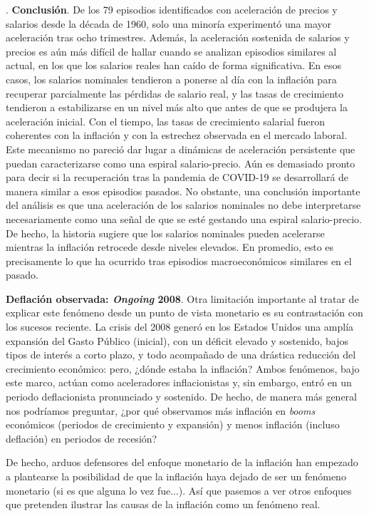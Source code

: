 \documentclass[10pt,a4paper]{article}
\newcounter{numitem}
\newenvironment{lnum}
      {\begin{list}{\arabic{numitem}.}{%
          \usecounter{numitem}%
          \setlength{\leftmargin}{1cm}%
          \setlength{\parskip}{3pt}%
          \setlength{\itemsep}{0pt}%
          \setlength{\parsep}{0pt}%
      }}
      {\end{list}}
\begin{document}
\begin{lnum}
{    \textbf{Conclusión}. De los 79 episodios identificados con aceleración de precios y salarios desde la década de 1960, solo una minoría experimentó una mayor aceleración tras ocho trimestres. Además, la aceleración sostenida de salarios y precios es aún más difícil de hallar cuando se analizan episodios similares al actual, en los que los salarios reales han caído de forma significativa. En esos casos, los salarios nominales tendieron a ponerse al día con la inflación para recuperar parcialmente las pérdidas de salario real, y las tasas de crecimiento tendieron a estabilizarse en un nivel más alto que antes de que se produjera la aceleración inicial. Con el tiempo, las tasas de crecimiento salarial fueron coherentes con la inflación y con la estrechez observada en el mercado laboral. Este mecanismo no pareció dar lugar a dinámicas de aceleración persistente que puedan caracterizarse como una espiral salario-precio. Aún es demasiado pronto para decir si la recuperación tras la pandemia de COVID-19 se desarrollará de manera similar a esos episodios pasados. No obstante, una conclusión importante del análisis es que una aceleración de los salarios nominales no debe interpretarse necesariamente como una señal de que se esté gestando una espiral salario-precio. De hecho, la historia sugiere que los salarios nominales pueden acelerarse mientras la inflación retrocede desde niveles elevados. En promedio, esto es precisamente lo que ha ocurrido tras episodios macroeconómicos similares en el pasado.
    }
    \item \textbf{Deflación observada: \textit{Ongoing} 2008}. Otra limitación importante al tratar de explicar este fenómeno desde un punto de vista monetario es su contrastación con los sucesos reciente. La crisis del 2008 generó en los Estados Unidos una amplía expansión del Gasto Público (inicial), con un déficit elevado y sostenido, bajos tipos de interés a corto plazo, y todo acompañado de una drástica reducción del crecimiento económico: pero, ¿dónde estaba la inflación? Ambos fenómenos, bajo este marco, actúan como aceleradores inflacionistas y, sin embargo, entró en un periodo deflacionista pronunciado y sostenido. De hecho, de manera más general nos podríamos preguntar, ¿por qué observamos más inflación en \textit{booms} económicos (periodos de crecimiento y expansión) y menos inflación (incluso deflación) en periodos de recesión?
\end{lnum}

De hecho, arduos defensores del enfoque monetario de la inflación han empezado a plantearse la posibilidad de que la inflación haya dejado de ser un fenómeno monetario (si es que alguna lo vez fue...). Así que pasemos a ver otros enfoques que pretenden ilustrar las causas de la inflación como un fenómeno real. 
\end{document}
